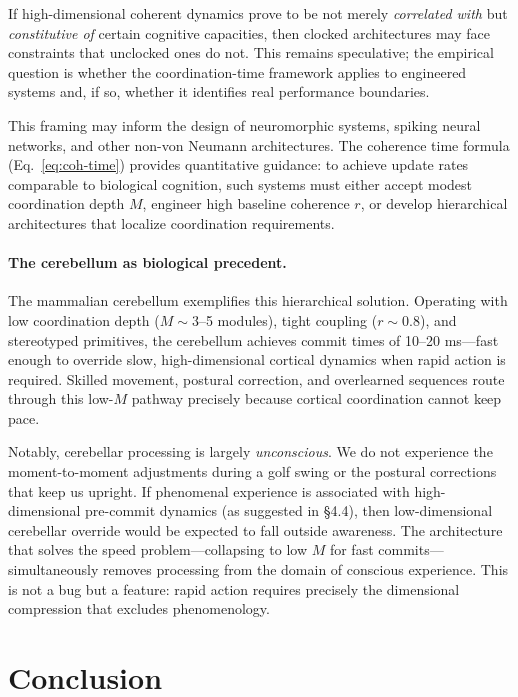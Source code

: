 \documentclass[12pt]{article}
\begin{document}
If high-dimensional coherent dynamics prove to be not merely \emph{correlated with} but \emph{constitutive of} certain cognitive capacities, then clocked architectures may face constraints that unclocked ones do not. This remains speculative; the empirical question is whether the coordination-time framework applies to engineered systems and, if so, whether it identifies real performance boundaries.

This framing may inform the design of neuromorphic systems, spiking neural networks, and other non-von Neumann architectures. The coherence time formula (Eq.~\ref{eq:coh-time}) provides quantitative guidance: to achieve update rates comparable to biological cognition, such systems must either accept modest coordination depth $M$, engineer high baseline coherence $r$, or develop hierarchical architectures that localize coordination requirements.

\paragraph{The cerebellum as biological precedent.} The mammalian cerebellum exemplifies this hierarchical solution. Operating with low coordination depth ($M \sim 3$--5 modules), tight coupling ($r \sim 0.8$), and stereotyped primitives, the cerebellum achieves commit times of 10--20 ms---fast enough to override slow, high-dimensional cortical dynamics when rapid action is required. Skilled movement, postural correction, and overlearned sequences route through this low-$M$ pathway precisely because cortical coordination cannot keep pace.

Notably, cerebellar processing is largely \emph{unconscious}. We do not experience the moment-to-moment adjustments during a golf swing or the postural corrections that keep us upright. If phenomenal experience is associated with high-dimensional pre-commit dynamics (as suggested in \S4.4), then low-dimensional cerebellar override would be expected to fall outside awareness. The architecture that solves the speed problem---collapsing to low $M$ for fast commits---simultaneously removes processing from the domain of conscious experience. This is not a bug but a feature: rapid action requires precisely the dimensional compression that excludes phenomenology.

\section{Conclusion}
\end{document}
